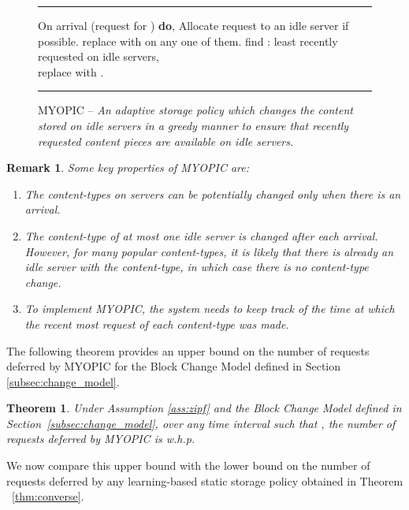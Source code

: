\documentclass[10pt, conference, letterpaper]{IEEEtran}
\newtheorem{remark}{Remark}
\newtheorem{theorem}{Theorem}
\begin{document}
\begin{figure}[h]
	\hrule
	\vspace{0.1in}
	\begin{algorithmic}[1]
		\STATE On arrival (request for ) \textbf{do},
		\STATE Allocate request to an idle server if possible.
		\STATE replace  with  on any one of them.
		\ELSE
		\STATE find : least recently requested on idle servers,\\ replace  with .
		\ENDIF
		\ENDIF
\end{algorithmic}
	\vspace{0.1in}
	\hrule
	\caption{MYOPIC -- \sl An adaptive storage policy which changes the content stored on idle servers in a greedy manner to ensure that recently requested content pieces are available on idle servers.}
	\label{fig:MYOPIC}
\end{figure}

\begin{remark} Some key properties of MYOPIC are:
	\begin{enumerate}
		\item The content-types on servers can be potentially changed only when
		there is an arrival.
		
		\item The content-type of at most one idle server is changed after each
		arrival. However, for many popular content-types, it is likely that
		there is already an idle server with the content-type, in which case
		there is no content-type change.
		
		\item To implement MYOPIC, the system needs to keep track of the time
		at which the recent most request of each content-type was made.
		
	\end{enumerate}
\end{remark}

The following theorem provides an upper bound on the number of
requests deferred by MYOPIC for the Block Change Model defined in Section
\ref{subsec:change_model}.
\begin{theorem}
	\label{thm:MYOPIC_static_arrival_rates}
	Under Assumption \ref{ass:zipf} and the Block Change Model defined in
	Section~\ref{subsec:change_model}, over any time interval  such
	that , the number of requests deferred by
	MYOPIC is  w.h.p.
\end{theorem}
We now compare this upper bound with the lower bound on the number of
requests deferred by any learning-based static storage policy obtained
in Theorem ~\ref{thm:converse}. 
\end{document}
